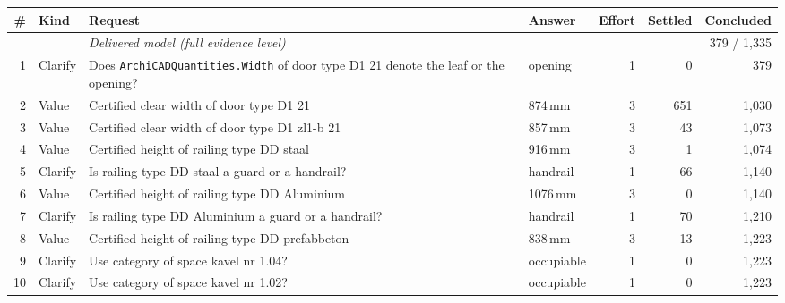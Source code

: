 \begin{tabularx}{\textwidth}{@{}rlXlrrr@{}}
\toprule
\# & Kind & Request & Answer & Effort & Settled & Concluded \\
\midrule
 & & \emph{Delivered model (full evidence level)} & & & & 379 / 1,335 \\
1 & Clarify & Does \texttt{ArchiCADQuantities.Width} of door type D1 21 denote the leaf or the opening? & opening & 1 & 0 & 379 \\
2 & Value & Certified clear width of door type D1 21 & 874\,mm & 3 & 651 & 1,030 \\
3 & Value & Certified clear width of door type D1 zl1-b 21 & 857\,mm & 3 & 43 & 1,073 \\
4 & Value & Certified height of railing type DD staal & 916\,mm & 3 & 1 & 1,074 \\
5 & Clarify & Is railing type DD staal a guard or a handrail? & handrail & 1 & 66 & 1,140 \\
6 & Value & Certified height of railing type DD Aluminium & 1076\,mm & 3 & 0 & 1,140 \\
7 & Clarify & Is railing type DD Aluminium a guard or a handrail? & handrail & 1 & 70 & 1,210 \\
8 & Value & Certified height of railing type DD prefabbeton & 838\,mm & 3 & 13 & 1,223 \\
9 & Clarify & Use category of space kavel nr 1.04? & occupiable & 1 & 0 & 1,223 \\
10 & Clarify & Use category of space kavel nr 1.02? & occupiable & 1 & 0 & 1,223 \\
\bottomrule
\end{tabularx}
